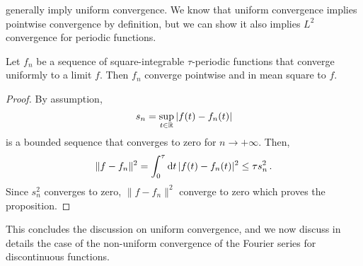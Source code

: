 generally imply uniform convergence. We know that uniform convergence implies pointwise convergence
by definition, but we can show it also implies $L^2$ convergence for periodic functions.
\begin{proposition}
  Let $f_n$ be a sequence of square-integrable $\tau$-periodic functions that converge uniformly to a limit $f$.
  Then $f_n$ converge pointwise and in mean square to $f$.
\end{proposition}
\begin{proof}
  By assumption,
  \begin{equation}
    s_n=\sup_{t\in\mathbb{R}}|f(t)-f_n(t)|
  \end{equation}
  is a bounded sequence that converges to zero for $n\to+\infty$. Then,
  \begin{equation}
    \|f-f_n\|^2=\int_{0}^{\tau}\mathrm{d} t\,|f(t)-f_n(t)|^2\leq \tau s_n^2\,.
  \end{equation}
  Since $s_n^2$ converges to zero, $\|f-f_n\|^2$ converge to zero which proves the proposition.
\end{proof}

This concludes the discussion on uniform convergence, and we now discuss in details the
case of the non-uniform convergence of the Fourier series for discontinuous functions.
